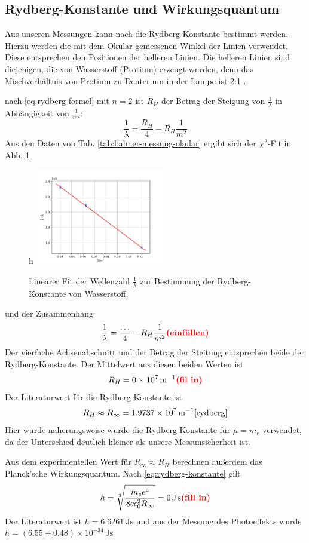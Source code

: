 \documentclass{article}
\newcommand{\defc}{black}
\newcommand{\colorT}[2][blue]{\color{#1}{#2}\color{\defc}}
\newcommand{\todo}[1]{\colorT[red]{\textbf{(#1)}}}
\begin{document}
\subsection{Rydberg-Konstante und Wirkungsquantum}
Aus unseren Messungen kann nach die Rydberg-Konstante bestimmt werden.
Hierzu werden die mit dem Okular gemessenen Winkel der Linien verwendet. Diese entsprechen den
Positionen der helleren Linien. Die helleren Linien sind diejenigen, die von Wasserstoff (Protium) erzeugt wurden,
denn das Mischverhältnis von Protium zu Deuterium in der Lampe ist 2:1 \cite{Anleitung}.

nach \eqref{eq:rydberg-formel} mit $n=2$ ist $R_H$ der Betrag der Steigung von $\frac{1}{\lambda}$ in Abhängigkeit von $\frac{1}{m^2}$:
\[
  \frac{1}{\lambda} = \frac{R_H}{4} - R_H \frac{1}{m^2}
\]
Aus den Daten von Tab. \ref{tab:balmer-messung-okular} ergibt sich der $\chi^2$-Fit in Abb. \ref{fig:rydberg-fit}
\begin{figure}{h}
  \centering
  \includegraphics[width=0.5\textwidth]{rydberg_fit}
  \caption{Linearer Fit der Wellenzahl $\frac{1}{\lambda}$ zur Bestimmung der Rydberg-Konstante von Wasserstoff.}
  \label{fig:rydberg-fit}
\end{figure}
und der Zusammenhang
\[
  \frac{1}{\lambda} = \frac{\dots}{4} - R_H \frac{1}{m^2} \todo{einfüllen}
\]
Der vierfache Achsenabschnitt und der Betrag der Steitung entsprechen beide der Rydberg-Konstante.
Der Mittelwert aus diesen beiden Werten ist
\[
  R_H = \SI{0e7}{\per\m}\todo{fil in}
\]
Der Literaturwert für die Rydberg-Konstante ist
\begin{equation}
  R_H \approx R_\infty = \SI{1.9737e7}{\per\m} \cite{rydberg}
\end{equation}
Hier wurde näherungsweise wurde die Rydberg-Konstante für $\mu=m_e$ verwendet, da der Unterschied deutlich
kleiner als unsere Messunsicherheit ist.
\todo{Diskussion}

Aus dem experimentellen Wert für $R_\infty \approx R_H$ berechnen außerdem das Planck'sche Wirkungsquantum.
Nach \eqref{eq:rydberg-konstante} gilt
\[
  h = \sqrt[3]{\frac{m_e e^4}{8c \epsilon_0^2 R_\infty}} = \SI{0}{\J\s} \todo{fill in}
\]
Der Literaturwert ist $h = \SI{6.6261}{\J\s}$ \cite{planck-h} und aus der Messung des Photoeffekts wurde
$h = (6.55 \pm 0.48) \times 10^{-34} \, \mathrm{Js}$
\end{document}
